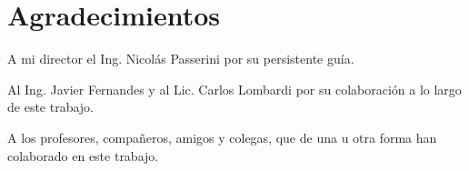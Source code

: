
\section{Agradecimientos}

A mi director el Ing. Nicolás Passerini por su persistente guía. 

Al Ing. Javier Fernandes y al Lic. Carlos Lombardi por su colaboración a lo
largo de este trabajo.

A los profesores, compañeros, amigos y colegas, que de una u otra forma han colaborado en este
trabajo.

